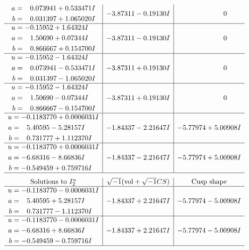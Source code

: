 \documentclass[1p]{elsarticle_modified}
\theoremstyle{definition}
\newcommand{\I}{\sqrt{-1}}
\begin{document}
$$\begin{array}{c|c|c}
\begin{aligned}
a &= \phantom{-}0.073941 + 0.533471 I \\
b &= \phantom{-}0.031397 + 1.065020 I\end{aligned}
 & -3.87311 - 0.19130 I & \phantom{-0.000000 } 0 \\ \hline\begin{aligned}
u &= -0.15952 + 1.64324 I \\
a &= \phantom{-}1.50690 + 0.07344 I \\
b &= \phantom{-}0.866667 + 0.154700 I\end{aligned}
 & -3.87311 - 0.19130 I & \phantom{-0.000000 } 0 \\ \hline\begin{aligned}
u &= -0.15952 - 1.64324 I \\
a &= \phantom{-}0.073941 - 0.533471 I \\
b &= \phantom{-}0.031397 - 1.065020 I\end{aligned}
 & -3.87311 + 0.19130 I & \phantom{-0.000000 } 0 \\ \hline\begin{aligned}
u &= -0.15952 - 1.64324 I \\
a &= \phantom{-}1.50690 - 0.07344 I \\
b &= \phantom{-}0.866667 - 0.154700 I\end{aligned}
 & -3.87311 + 0.19130 I & \phantom{-0.000000 } 0 \\ \hline\begin{aligned}
u &= -0.1183770 + 0.0006031 I \\
a &= \phantom{-}5.40595 - 5.28157 I \\
b &= \phantom{-}0.731777 + 1.112370 I\end{aligned}
 & -1.84337 - 2.21647 I & -5.77974 + 5.00908 I \\ \hline\begin{aligned}
u &= -0.1183770 + 0.0006031 I \\
a &= -6.68316 - 8.66836 I \\
b &= -0.549459 + 0.759716 I\end{aligned}
 & -1.84337 - 2.21647 I & -5.77974 + 5.00908 I\\
 \hline 
 \end{array}$$\newpage$$\begin{array}{c|c|c}  
\text{Solutions to }I^u_{2}& \I (\text{vol} + \sqrt{-1}CS) & \text{Cusp shape}\\
 \hline 
\begin{aligned}
u &= -0.1183770 - 0.0006031 I \\
a &= \phantom{-}5.40595 + 5.28157 I \\
b &= \phantom{-}0.731777 - 1.112370 I\end{aligned}
 & -1.84337 + 2.21647 I & -5.77974 - 5.00908 I \\ \hline\begin{aligned}
u &= -0.1183770 - 0.0006031 I \\
a &= -6.68316 + 8.66836 I \\
b &= -0.549459 - 0.759716 I\end{aligned}
 & -1.84337 + 2.21647 I & -5.77974 - 5.00908 I\\
 \hline 
 \end{array}$$\newpage\newpage\renewcommand{\arraystretch}{1}
\end{document}
